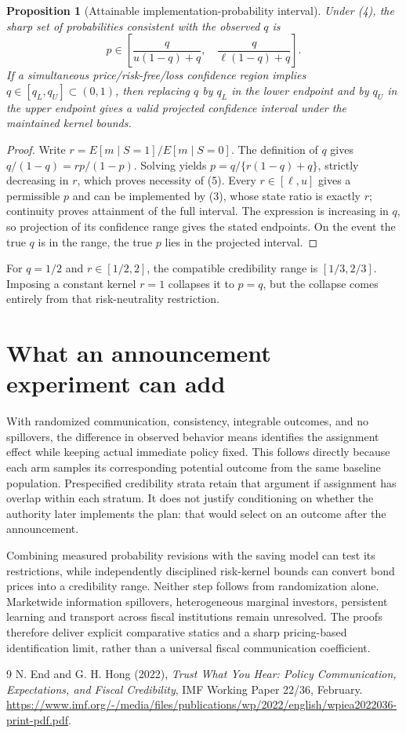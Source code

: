 \documentclass[11pt]{article}
\newtheorem{proposition}[theorem]{Proposition}
\theoremstyle{definition}
\begin{document}
\begin{proposition}[Attainable implementation-probability interval]
Under (4), the sharp set of probabilities consistent with the observed $q$ is
\[
 p\in\left[\frac{q}{u(1-q)+q},\quad
             \frac{q}{\ell(1-q)+q}\right].
 \tag{5}
\]
If a simultaneous price/risk-free/loss confidence region implies $q\in[q_L,q_U]\subset(0,1)$, then replacing $q$ by $q_L$ in the lower endpoint and by $q_U$ in the upper endpoint gives a valid projected confidence interval under the maintained kernel bounds.
\end{proposition}
\begin{proof}
Write $r=E[m\mid S=1]/E[m\mid S=0]$. The definition of $q$ gives
$q/(1-q)=r p/(1-p)$. Solving yields $p=q/\{r(1-q)+q\}$, strictly decreasing in $r$, which proves necessity of (5). Every $r\in[\ell,u]$ gives a permissible $p$ and can be implemented by (3), whose state ratio is exactly $r$; continuity proves attainment of the full interval. The expression is increasing in $q$, so projection of its confidence range gives the stated endpoints. On the event the true $q$ is in the range, the true $p$ lies in the projected interval.
\end{proof}
For $q=1/2$ and $r\in[1/2,2]$, the compatible credibility range is $[1/3,2/3]$. Imposing a constant kernel $r=1$ collapses it to $p=q$, but the collapse comes entirely from that risk-neutrality restriction.

\section*{What an announcement experiment can add}
With randomized communication, consistency, integrable outcomes, and no spillovers, the difference in observed behavior means identifies the assignment effect while keeping actual immediate policy fixed. This follows directly because each arm samples its corresponding potential outcome from the same baseline population. Prespecified credibility strata retain that argument if assignment has overlap within each stratum. It does not justify conditioning on whether the authority later implements the plan: that would select on an outcome after the announcement.

Combining measured probability revisions with the saving model can test its restrictions, while independently disciplined risk-kernel bounds can convert bond prices into a credibility range. Neither step follows from randomization alone. Marketwide information spillovers, heterogeneous marginal investors, persistent learning and transport across fiscal institutions remain unresolved. The proofs therefore deliver explicit comparative statics and a sharp pricing-based identification limit, rather than a universal fiscal communication coefficient.

\begin{thebibliography}{9}
 N. End and G. H. Hong (2022), \emph{Trust What You Hear: Policy Communication, Expectations, and Fiscal Credibility}, IMF Working Paper 22/36, February. \url{https://www.imf.org/-/media/files/publications/wp/2022/english/wpiea2022036-print-pdf.pdf}.
\end{thebibliography}
\end{document}
